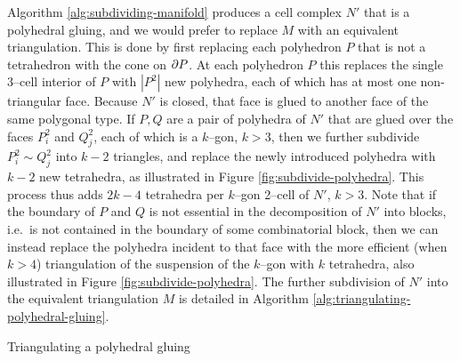 
Algorithm \ref{alg:subdividing-manifold} produces a cell complex $N'$ that is a polyhedral gluing, and we would prefer to replace $M$ with an equivalent triangulation.
This is done by first replacing each polyhedron $P$ that is not a tetrahedron with the cone on $\partial P$.
At each polyhedron $P$ this replaces the single 3--cell interior of $P$ with $|P^2|$ new polyhedra, each of which has at most one non-triangular face.
Because $N'$ is closed, that face is glued to another face of the same polygonal type.
If $P,Q$ are a pair of polyhedra of $N'$ that are glued over the faces $P_i^2$ and $Q_j^2$, each of which is a $k$--gon, $k>3$, then we further subdivide $P_i^2\sim Q_j^2$ into $k-2$ triangles, and replace the newly introduced polyhedra with $k-2$ new tetrahedra, as illustrated in Figure \ref{fig:subdivide-polyhedra}.
This process thus adds $2k-4$ tetrahedra per $k$--gon 2--cell of $N'$, $k>3$.
Note that if the boundary of $P$ and $Q$ is not essential in the decomposition of $N'$ into blocks, i.e.\ is not contained in the boundary of some combinatorial block, then we can instead replace the polyhedra incident to that face with the more efficient (when $k>4$) triangulation of the suspension of the $k$--gon with $k$ tetrahedra, also illustrated in Figure \ref{fig:subdivide-polyhedra}.
The further subdivision of $N'$ into the equivalent triangulation $M$ is detailed in Algorithm \ref{alg:triangulating-polyhedral-gluing}.

\begin{algorithm}[h!]
	\caption{Triangulating a polyhedral gluing}
	\label{alg:triangulating-polyhedral-gluing}
\end{algorithm}


